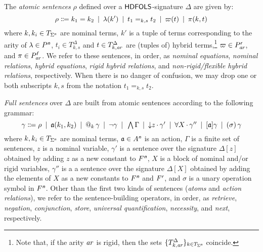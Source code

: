 \documentclass[a4paper,UKenglish,cleveref,autoref]{lipics-v2019}
\begin{document}


The \emph{atomic sentences} \(\rho\) defined over a \({\mathsf{HDFOLS}}\)-signature \(\Delta\) are given by:
\[
  \rho \Coloneqq
  k_{1} = k_{2} \enspace|\enspace
  \lambda(k') \enspace|\enspace
  t_{1} =_{k, s} t_{2} \enspace|\enspace
  \varpi(t) \enspace|\enspace
  \pi(k, t)
\]
where \(k, k_{i} \in T_{\Sigma^{\text{\normalfont\sffamily\itshape n}}}\) are nominal terms,
\(k'\) is a tuple of terms corresponding to the arity of \(\lambda \in P^{\text{\normalfont\sffamily\itshape n}}\),
\(t_{i} \in T^{\Delta}_{k, s}\) and \(t \in T^{\Delta}_{k,\mathit{a\mkern -1mu r}}\) are (tuples of) hybrid terms,\footnote{Note that, if the arity \(\mathit{a\mkern -1mu r}\) is rigid, then the sets \(\{T^{\Delta}_{k,\mathit{a\mkern -1mu r}}\}_{k \in T_{\Sigma^{\text{\normalfont\sffamily\itshape n}}}}\) coincide.}
\(\varpi \in P^{\text{\normalfont\sffamily\itshape r}}_{\mathit{a\mkern -1mu r}}\),
and \(\pi \in P^{\text{\normalfont\sffamily\itshape f}}_{\mathit{a\mkern -1mu r}}\).
We refer to these sentences, in order, as \emph{nominal equations}, \emph{nominal relations}, \emph{hybrid equations}, \emph{rigid hybrid relations}, and \emph{non-rigid/flexible hybrid relations}, respectively.
When there is no danger of confusion, we may drop one or both subscripts \(k, s\) from the notation \(t_{1} =_{k, s} t_{2}\).

\emph{Full sentences}\label{sentence-building-operators} over \(\Delta\) are built from atomic sentences according to the following grammar:
\[
  \gamma \Coloneqq
  \rho \enspace|\enspace
  \mathfrak{a}(k_{1}, k_{2}) \enspace|\enspace
  @_{k}\, \gamma \enspace|\enspace
  \lnot \gamma \enspace|\enspace
  \textstyle\bigwedge \Gamma \enspace|\enspace
  {\downarrow}z\,{\cdot}\, \gamma' \enspace|\enspace
  \forall X\,{\cdot}\, \gamma'' \enspace|\enspace
  [\mathfrak{a}] \gamma \enspace|\enspace
  (\sigma)\, \gamma
\]
where \(k, k_{i} \in T_{\Sigma^{\text{\normalfont\sffamily\itshape n}}}\) are nominal terms,
\(\mathfrak{a} \in A^{\text{\normalfont\sffamily\itshape n}}\) is an action,
\(\Gamma\) is a finite set of sentences,
\(z\) is a nominal variable,
\(\gamma'\) is a sentence over the signature \(\Delta[z]\) obtained by adding \(z\) as a new constant to \(F^{\text{\normalfont\sffamily\itshape n}}\),
\(X\) is a block of nominal and/or rigid variables,
\(\gamma''\) is a a sentence over the signature \(\Delta[X]\) obtained by adding the elements of \(X\) as a new constants to \(F^{\text{\normalfont\sffamily\itshape n}}\) and \(F^{\text{\normalfont\sffamily\itshape r}}\), and
\(\sigma\) is a unary operation symbol in \(F^{\text{\normalfont\sffamily\itshape n}}\).
Other than the first two kinds of sentences (\emph{atoms} and \emph{action relations}), we refer to the sentence-building operators, in order, as \emph{retrieve}, \emph{negation}, \emph{conjunction}, \emph{store}, \emph{universal quantification}, \emph{necessity}, and \emph{next}, respectively.
\end{document}
